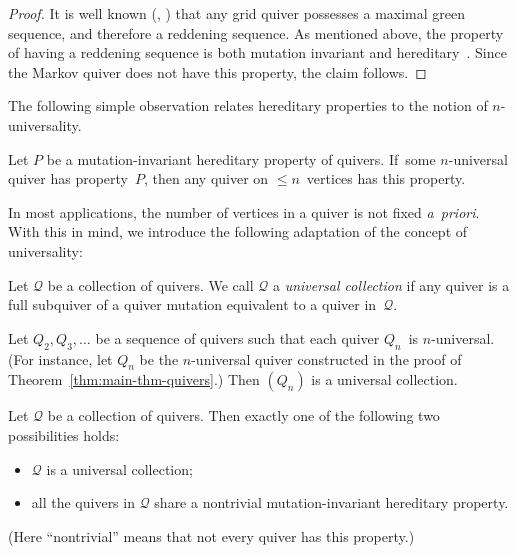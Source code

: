 \documentclass[ALCO,ThmDefs,Unicode,epreuves,published]{cedram}
\begin{document}
\begin{proof}
It is well known (\cf \cite[Section~1]{marsh-scott}, \cite[Section~5]{keller-maxgreen}) that any grid quiver possesses a maximal green sequence, and therefore a reddening sequence. As mentioned above, the property of having a reddening sequence is both mutation invariant and hereditary~\cite[\emph{loc.\ cit.}]{muller-max-green}. Since the Markov quiver does not have this property, the claim follows. 
\end{proof}

The following simple observation relates hereditary properties to the notion of $n$-universality. 


\begin{remark}
\label{rem:enough-n-universal}
Let $P$ be a mutation-invariant hereditary property of quivers. 
If~some $n$-universal quiver has property~$P$, then any quiver on $\le n$~vertices has this property.
\end{remark}

In most applications, the number of vertices in a quiver is not fixed \emph{a~priori}. With this in mind, we introduce the following adaptation of the concept of universality: 

\begin{definition}
\label{def:universal-collection}
Let $\mathcal{Q}$ be a collection of quivers. We call $\mathcal{Q}$ a \emph{universal collection} if any quiver is a full subquiver of a quiver mutation equivalent to a quiver in~$\mathcal{Q}$. 
\end{definition}


\begin{remark}
\label{rem:universal-from-n-universal}
Let $Q_2, Q_3,\dots$ be a sequence of quivers such that each quiver $Q_n$~is \hbox{$n$-universal}. (For instance, let $Q_n$ be the $n$-universal quiver constructed in the proof of Theorem~\ref{thm:main-thm-quivers}.) Then $(Q_n)$ is a universal collection. 
\end{remark}


\begin{proposition}
\label{prop:universal-hereditary-alternative}
Let $\mathcal{Q}$ be a collection of quivers. Then exactly one of the following two possibilities holds:
\begin{itemize}%
\item
$\mathcal{Q}$ is a universal collection; 
\item
all the quivers in $\mathcal{Q}$ share a nontrivial mutation-invariant hereditary property.
\end{itemize}
(Here ``nontrivial'' means that not every quiver has this property.) 
\end{proposition}
\end{document}
